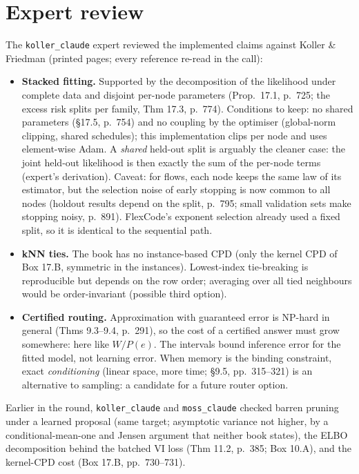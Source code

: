 \documentclass[10pt,a4paper]{article}
\newcommand{\code}[1]{\texttt{#1}}
\begin{document}
\section{Expert review}
The \code{koller\_claude} expert reviewed the implemented claims against Koller \& Friedman
(printed pages; every reference re-read in the call):
\begin{itemize}
  \item \textbf{Stacked fitting.} Supported by the decomposition of the likelihood under complete
  data and disjoint per-node parameters (Prop.\ 17.1, p.\ 725; the excess risk splits per family,
  Thm 17.3, p.\ 774). Conditions to keep: no shared parameters (§17.5, p.\ 754) and no coupling by
  the optimiser (global-norm clipping, shared schedules); this implementation clips per node and
  uses element-wise Adam. A \emph{shared} held-out split is arguably the cleaner case: the joint
  held-out likelihood is then exactly the sum of the per-node terms (expert's derivation). Caveat:
  for flows, each node keeps the same law of its estimator, but the selection noise of early
  stopping is now common to all nodes (holdout results depend on the split, p.\ 795; small
  validation sets make stopping noisy, p.\ 891). FlexCode's exponent selection already used a
  fixed split, so it is identical to the sequential path.
  \item \textbf{kNN ties.} The book has no instance-based CPD (only the kernel CPD of Box 17.B,
  symmetric in the instances). Lowest-index tie-breaking is reproducible but depends on the row
  order; averaging over all tied neighbours would be order-invariant (possible third option).
  \item \textbf{Certified routing.} Approximation with guaranteed error is NP-hard in general
  (Thms 9.3--9.4, p.\ 291), so the cost of a certified answer must grow somewhere: here like
  $W/P(e)$. The intervals bound inference error for the fitted model, not learning error. When
  memory is the binding constraint, exact \emph{conditioning} (linear space, more time; §9.5,
  pp.\ 315--321) is an alternative to sampling: a candidate for a future router option.
\end{itemize}
Earlier in the round, \code{koller\_claude} and \code{moss\_claude} checked barren pruning under a
learned proposal (same target; asymptotic variance not higher, by a conditional-mean-one and Jensen
argument that neither book states), the ELBO decomposition behind the batched VI loss
(Thm 11.2, p.\ 385; Box 10.A), and the kernel-CPD cost (Box 17.B, pp.\ 730--731).
\end{document}
